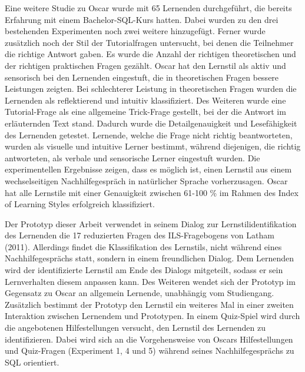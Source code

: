         Eine weitere Studie zu Oscar wurde mit 65 Lernenden durchgeführt, die bereits Erfahrung mit einem Bachelor-SQL-Kurs hatten. 
        Dabei wurden zu den drei bestehenden Experimenten noch zwei weitere hinzugefügt. Ferner wurde zusätzlich noch der Stil der 
        Tutorialfragen untersucht, bei denen die Teilnehmer die richtige Antwort gaben.
        Es wurde die Anzahl der richtigen theoretischen und der richtigen praktischen Fragen gezählt.
        Oscar hat den Lernstil als aktiv und sensorisch bei den Lernenden eingestuft, die in theoretischen Fragen bessere Leistungen zeigten. Bei 
        schlechterer Leistung in theoretischen Fragen
        wurden die Lernenden als reflektierend und intuitiv klassifiziert.
        Des Weiteren wurde eine Tutorial-Frage als eine allgemeine \glqq Trick-Frage\grqq{} gestellt, bei
        der die Antwort im erläuternden Text stand. Dadurch wurde die Detailgenauigkeit und Lesefähigkeit des Lernenden getestet. 
        Lernende, welche die Frage nicht richtig beantworteten, wurden als visuelle und intuitive Lerner bestimmt, während diejenigen,
        die richtig antworteten, als verbale und sensorische Lerner eingestuft wurden.
        Die experimentellen Ergebnisse zeigen, dass es möglich ist, einen Lernstil aus einem wechselseitigen Nachhilfegespräch
        in natürlicher Sprache vorherzusagen. Oscar hat alle Lernstile mit einer Genauigkeit zwischen 61-100 \% 
        im Rahmen des Index of Learning Styles erfolgreich klassifiziert.  \parencite[105 ff.]{Latham.2012}
        
        Der Prototyp dieser Arbeit verwendet in seinem Dialog zur Lernstilidentifikation des Lernenden 
        die 17 reduzierten Fragen des ILS-Fragebogens von Latham (2011). Allerdings findet die Klassifikation 
        des Lernstils, nicht während eines Nachhilfegesprächs statt, sondern in einem freundlichen Dialog.
        Dem Lernenden wird der identifizierte Lernstil am Ende des Dialogs mitgeteilt, sodass er sein 
        Lernverhalten diesem anpassen kann. Des Weiteren wendet sich der Prototyp im Gegensatz zu Oscar an allgemein Lernende, unabhängig vom 
        Studiengang. Zusätzlich bestimmt der Prototyp den Lernstil ein weiteres Mal in einer zweiten Interaktion zwischen 
        Lernendem und Prototypen. In einem Quiz-Spiel wird durch die angebotenen Hilfestellungen versucht, den Lernstil 
        des Lernenden zu identifizieren. Dabei wird sich an die Vorgehensweise von Oscars Hilfestellungen und Quiz-Fragen (Experiment 1, 4 und 5) während 
        seines Nachhilfegesprächs zu SQL orientiert. 

